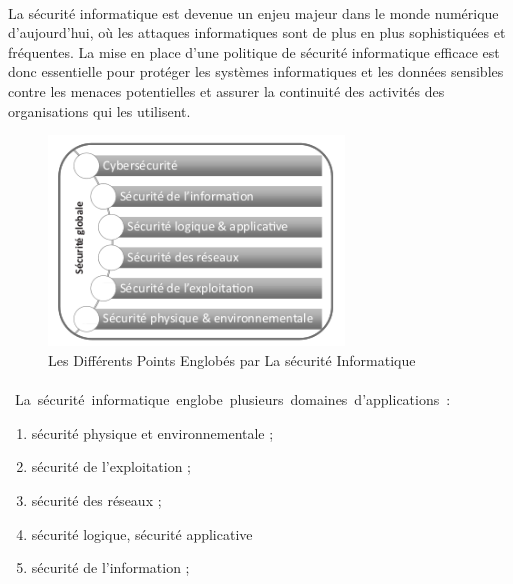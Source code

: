 \paragraph{ }  La sécurité informatique est devenue un enjeu majeur dans le monde numérique d’aujourd’hui, où les attaques informatiques sont de plus en plus sophistiquées et fréquentes. La mise en place d'une politique de sécurité informatique efficace est donc essentielle pour protéger les systèmes informatiques et les données sensibles contre les menaces potentielles et assurer la continuité des activités des organisations qui les utilisent.

\pagebreak
\begin{figure}[h]
	\begin{center}
\includegraphics[width=0.7\textwidth]{PhotoMemoire/image_sec.png}
\caption{Les Différents Points Englobés par La sécurité Informatique}
	\end{center}
\end{figure}
\paragraph{ }
\hbox{ La sécurité informatique englobe plusieurs domaines d'applications :}
\vspace{5mm}
\begin{enumerate}
 

\item \space   sécurité physique et environnementale ;\\
\item  \space   sécurité de l’exploitation ;\\
\item   \space  sécurité des réseaux ;\\
\item   \space  sécurité logique, sécurité applicative 
\item \space sécurité de l’information ;\\

\end{enumerate}

